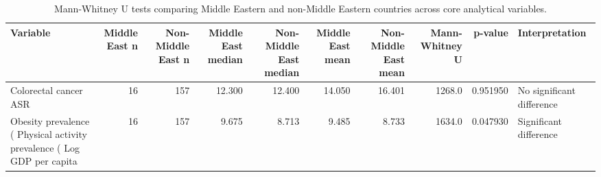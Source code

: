 \begin{table}
\centering
\caption{Mann-Whitney U tests comparing Middle Eastern and non-Middle Eastern countries across core analytical variables.}
\label{tab:middle_east_vs_non_middle_east}
\begin{tabular}{lrrrrrrrrl}
\toprule
                        Variable &  Middle East n &  Non-Middle East n &  Middle East median &  Non-Middle East median &  Middle East mean &  Non-Middle East mean &  Mann-Whitney U &  p-value &            Interpretation \\
\midrule
           Colorectal cancer ASR &             16 &                157 &              12.300 &                  12.400 &            14.050 &                16.401 &          1268.0 & 0.951950 & No significant difference \\
          Obesity prevalence (%
Physical activity prevalence (%
              Log GDP per capita &             16 &                157 &               9.675 &                   8.713 &             9.485 &                 8.733 &          1634.0 & 0.047930 &    Significant difference \\
\bottomrule
\end{tabular}
\end{table}
